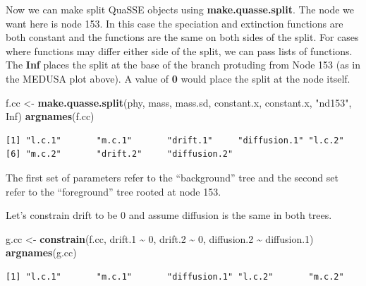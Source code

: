 \documentclass[
]{book}
\newenvironment{Shaded}{\begin{snugshade}}{\end{snugshade}}
\newcommand{\DecValTok}[1]{\textcolor[rgb]{0.00,0.00,0.81}{#1}}
\newcommand{\FloatTok}[1]{\textcolor[rgb]{0.00,0.00,0.81}{#1}}
\newcommand{\KeywordTok}[1]{\textcolor[rgb]{0.13,0.29,0.53}{\textbf{#1}}}
\newcommand{\NormalTok}[1]{#1}
\newcommand{\OperatorTok}[1]{\textcolor[rgb]{0.81,0.36,0.00}{\textbf{#1}}}
\newcommand{\OtherTok}[1]{\textcolor[rgb]{0.56,0.35,0.01}{#1}}
\newcommand{\StringTok}[1]{\textcolor[rgb]{0.31,0.60,0.02}{#1}}
\begin{document}
Now we can make split QuaSSE objects using \textbf{make.quasse.split}. The node we want here is node 153. In this case the speciation and extinction functions are both constant and the functions are the same on both sides of the split. For cases where functions may differ either side of the split, we can pass lists of functions. The \textbf{Inf} places the split at the base of the branch protuding from Node 153 (as in the MEDUSA plot above). A value of \textbf{0} would place the split at the node itself.

\begin{Shaded}
\begin{Highlighting}[]
\NormalTok{f.cc \textless{}{-}}\StringTok{ }\KeywordTok{make.quasse.split}\NormalTok{(phy, mass, mass.sd, }
\NormalTok{                          constant.x, constant.x, }
                          \StringTok{"nd153"}\NormalTok{, }\OtherTok{Inf}\NormalTok{)}
\KeywordTok{argnames}\NormalTok{(f.cc)}
\end{Highlighting}
\end{Shaded}

\begin{verbatim}
[1] "l.c.1"       "m.c.1"       "drift.1"     "diffusion.1" "l.c.2"      
[6] "m.c.2"       "drift.2"     "diffusion.2"
\end{verbatim}

The first set of parameters refer to the ``background'' tree and the second set refer to the ``foreground'' tree rooted at node 153.

Let's constrain drift to be 0 and assume diffusion is the same in both trees.

\begin{Shaded}
\begin{Highlighting}[]
\NormalTok{g.cc \textless{}{-}}\StringTok{ }\KeywordTok{constrain}\NormalTok{(f.cc, drift}\FloatTok{.1} \OperatorTok{\textasciitilde{}}\StringTok{ }\DecValTok{0}\NormalTok{, drift}\FloatTok{.2} \OperatorTok{\textasciitilde{}}\StringTok{ }\DecValTok{0}\NormalTok{, }
\NormalTok{                  diffusion}\FloatTok{.2} \OperatorTok{\textasciitilde{}}\StringTok{ }\NormalTok{diffusion}\FloatTok{.1}\NormalTok{)}
\KeywordTok{argnames}\NormalTok{(g.cc)}
\end{Highlighting}
\end{Shaded}

\begin{verbatim}
[1] "l.c.1"       "m.c.1"       "diffusion.1" "l.c.2"       "m.c.2"      
\end{verbatim}
\end{document}
